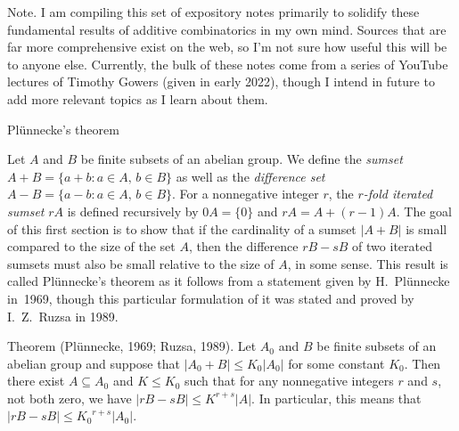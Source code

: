 


\def\FF{{\bf F}}
\def\TT{{\bf T}}
\def\bar{\overline}
\def\hat{\widehat}
\def\norm#1{|\!|#1|\!|}
\def\bignorm#1{\big|\!\big|#1\big|\!\big|}
\def\Norm#1{\Big|\!\Big|#1\Big|\!\Big|}
\def\normm#1{\bigg|\!\bigg|#1\bigg|\!\bigg|}

\widemargins
{}


 \ninebf Note.
\ninepoint
I am compiling this set of expository notes primarily to solidify these fundamental results of
additive combinatorics in
my own mind. Sources that are far more comprehensive exist on the web, so I'm not sure
how useful this will be to anyone else. Currently, the bulk of these notes come from
a series of YouTube lectures of Timothy Gowers (given in early 2022), though I intend
in future to add more relevant topics as I learn about them.

\bigskip

\advsect Pl\"unnecke's theorem

Let $A$ and $B$ be finite subsets of an abelian group. We define the {\it sumset}
$A+B = \{a+b : a\in A,\, b\in B\}$ as well as the {\it difference set}
$A-B = \{a-b : a\in A,\, b\in B\}$. For a nonnegative integer $r$, the {\it $r$-fold iterated sumset}
$rA$ is defined recursively by $0A = \{0\}$ and $rA = A+(r-1)A$. The goal of this first section
is to show that if the cardinality of
a sumset $|A+B|$ is small compared to the size of the set $A$, then the difference
$rB-sB$ of two iterated sumsets must also be small relative to the size of $A$,
in some sense. This result is called Pl\"unnecke's
theorem as it follows from a statement given by H.~Pl\"unnecke in~1969, though this particular
formulation of it was stated and proved by I.~Z.~Ruzsa in 1989.

\edef\thmplunnecke{\the\thmcount}
\parenproclaim Theorem {\advthm} (Pl\"unnecke, {\rm 1969;} Ruzsa, {\rm 1989}). Let $A_0$ and
$B$ be finite subsets of an abelian group and suppose that $|A_0+B|\le K_0|A_0|$ for some constant $K_0$.
Then there exist $A\subseteq A_0$ and $K\le K_0$ such that
for any nonnegative integers $r$ and $s$, not both zero, we have $|rB-sB| \le K^{r+s}|A|$. In particular,
this means that $|rB-sB| \le {K_0}^{r+s}|A_0|$.

